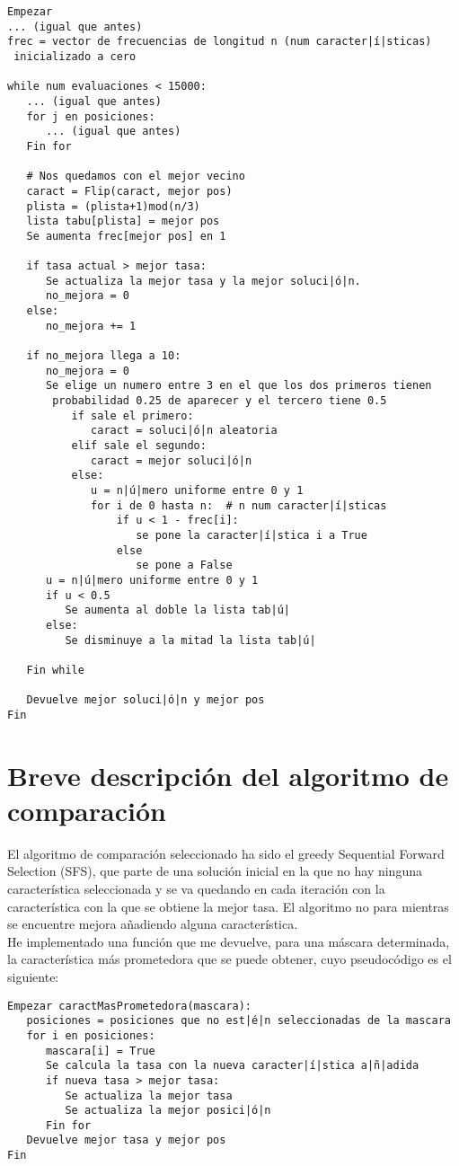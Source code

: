 \documentclass[12pt]{article}
\begin{document}
\begin{lstlisting}
Empezar
... (igual que antes)
frec = vector de frecuencias de longitud n (num caracter|í|sticas)
 inicializado a cero

while num evaluaciones < 15000:
   ... (igual que antes)
   for j en posiciones:
      ... (igual que antes)
   Fin for
   
   # Nos quedamos con el mejor vecino
   caract = Flip(caract, mejor pos)
   plista = (plista+1)mod(n/3)
   lista tabu[plista] = mejor pos
   Se aumenta frec[mejor pos] en 1   
   
   if tasa actual > mejor tasa:
      Se actualiza la mejor tasa y la mejor soluci|ó|n.
      no_mejora = 0
   else:
      no_mejora += 1
   
   if no_mejora llega a 10:
      no_mejora = 0
      Se elige un numero entre 3 en el que los dos primeros tienen
       probabilidad 0.25 de aparecer y el tercero tiene 0.5
          if sale el primero:
             caract = soluci|ó|n aleatoria
          elif sale el segundo:
             caract = mejor soluci|ó|n
          else:
             u = n|ú|mero uniforme entre 0 y 1
             for i de 0 hasta n:  # n num caracter|í|sticas
                 if u < 1 - frec[i]:
                    se pone la caracter|í|stica i a True
                 else
                    se pone a False
      u = n|ú|mero uniforme entre 0 y 1
      if u < 0.5
         Se aumenta al doble la lista tab|ú|
      else:
         Se disminuye a la mitad la lista tab|ú|

   Fin while
   
   Devuelve mejor soluci|ó|n y mejor pos
Fin

\end{lstlisting}

\newpage

\section{Breve descripción del algoritmo de comparación}
El algoritmo de comparación seleccionado ha sido el greedy Sequential Forward Selection (SFS), que parte de una solución inicial en la que no hay ninguna característica seleccionada y se va quedando en cada iteración con la característica con la que se obtiene la mejor tasa. El algoritmo no para mientras se encuentre mejora añadiendo alguna característica.\\
He implementado una función que me devuelve, para una máscara determinada, la característica más prometedora que se puede obtener, cuyo pseudocódigo es el siguiente:
\begin{lstlisting}
Empezar caractMasPrometedora(mascara):
   posiciones = posiciones que no est|é|n seleccionadas de la mascara
   for i en posiciones:
      mascara[i] = True
      Se calcula la tasa con la nueva caracter|í|stica a|ñ|adida
      if nueva tasa > mejor tasa:
         Se actualiza la mejor tasa
         Se actualiza la mejor posici|ó|n
      Fin for
   Devuelve mejor tasa y mejor pos
Fin
\end{lstlisting}
\end{document}
